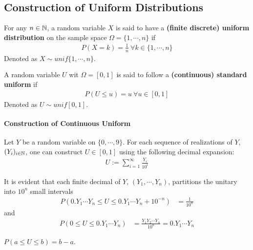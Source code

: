 \documentclass{article}
\begin{document}
	\subsection{Construction of Uniform Distributions}
   	\begin{definition}
   		For any $n \in \mathbb{N}$, a random variable $X$ is said to have a \textbf{(finite discrete) uniform distribution} on the sample space $\Omega = \{1,\cdots,n\}$ if
   		\begin{align}
   			P(X=k) = \frac{1}{n}\ \forall k \in \{1,\cdots,n\}
   		\end{align}
   		Denoted as $X \sim unif\{1,\cdots,n\}$.
   	\end{definition}

   	\begin{definition}
   		A random variable $U$ wit $\Omega = [0, 1]$ is said to follow a \textbf{(continuous) standard uniform} if 
   		\begin{align}
   			P(U \leq u) = u\ \forall u \in [0, 1]	
   		\end{align}
   		Denoted as $U \sim unif[0, 1]$.
   	\end{definition}
   	
   	\paragraph{Construction of Continuous Uniform} Let $Y$ be a random variable on $\{0, \cdots, 9\}$. For each sequence of realizations of $Y$, $(Y_i)_{i \in \mathbb{N}}$, one can construct $U \in [0, 1]$ using the following decimal expansion:
   	\begin{align}
   		U := \sum_{i=1}^\infty \frac{Y_i}{10^i}
   	\end{align}
   	
   	\begin{proposition}
   		It is evident that each finite decimal  of $Y$, $(Y_1, \cdots, Y_n)$, partitions the unitary into $10^n$ small intervals 
   		\begin{align}
   			P(0.Y_1\cdots Y_n \leq U \leq 0.Y_1\cdots Y_n + 10^{-n}) &= \frac{1}{10^n}
   		\end{align}
   		and 
   		\begin{align}
   			P(0 \leq U \leq 0.Y_1\cdots Y_n) &= \frac{Y_1 Y_2 \cdots Y_n}{10^n} = 0.Y_1\cdots Y_n
   		\end{align}
   	\end{proposition}
   	
   	\begin{proposition}
   		$P(a \leq U \leq b) = b - a$.
   	\end{proposition}
   	
\end{document}

